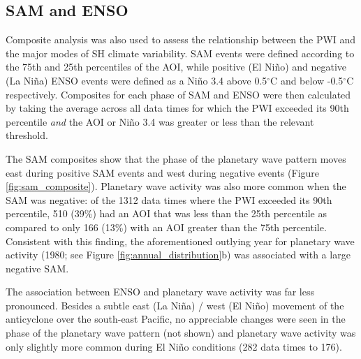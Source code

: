 \subsection{SAM and ENSO}

Composite analysis was also used to assess the relationship between the PWI and the major modes of SH climate variability. SAM events were defined according to the 75th and 25th percentiles of the AOI, while positive (El Ni\~{n}o) and negative (La Ni\~{n}a) ENSO events were defined as a Ni\~{n}o 3.4 above 0.5$^{\circ}$C and below -0.5$^{\circ}$C respectively. Composites for each phase of SAM and ENSO were then calculated by taking the average across all data times for which the PWI exceeded its 90th percentile \textit{and} the AOI or Ni\~{n}o 3.4 was greater or less than the relevant threshold. 

The SAM composites show that the phase of the planetary wave pattern moves east during positive SAM events and west during negative events (Figure \ref{fig:sam_composite}). Planetary wave activity was also more common when the SAM was negative: of the 1312 data times where the PWI exceeded its 90th percentile, 510 (39\%) had an AOI that was less than the 25th percentile as compared to only 166 (13\%) with an AOI greater than the 75th percentile. Consistent with this finding, the aforementioned outlying year for planetary wave activity (1980; see Figure \ref{fig:annual_distribution}b) was associated with a large negative SAM.

The association between ENSO and planetary wave activity was far less pronounced. Besides a subtle east (La Ni\~{n}a) / west (El Ni\~{n}o) movement of the anticyclone over the south-east Pacific, no appreciable changes were seen in the phase of the planetary wave pattern (not shown) and planetary wave activity was only slightly more common during El Ni\~{n}o conditions (282 data times to 176).      